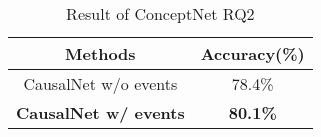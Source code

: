 \begin{table}[th]
\centering
\caption{Result of ConceptNet RQ2}
\begin{tabular}{cc}
\hline
Methods & Accuracy(\%) \\
\hline
CausalNet w/o events & 78.4\%  \\
{\bf CausalNet w/ events} & {\bf 80.1\% }  \\
\hline
\end{tabular}
\label{tab:rq2}
\end{table}
